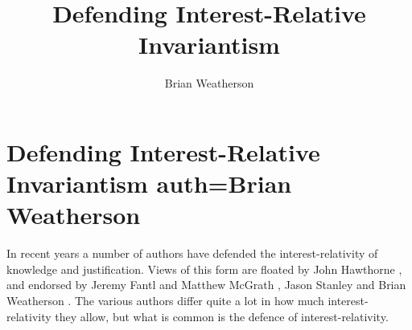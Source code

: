 \documentclass[oneside]{book}
\title{Defending Interest-Relative Invariantism}
\author{Brian Weatherson}
\begin{document}



\setcounter{paper}{0}
\pagestyle{plain}

\chapter[Defending IRI]{Defending Interest-Relative Invariantism auth=Brian Weatherson}

%
%
%

\noindent In recent years a number of authors have defended the interest-relativity of knowledge and justification.   Views of this form are floated by John Hawthorne \citeyearpar{Hawthorne2004}, and endorsed by Jeremy Fantl and Matthew McGrath \citeyearpar{Fantl2002, FantlMcGrath2009}, Jason Stanley \citeyearpar{Stanley2005-STAKAP} and Brian Weatherson \citeyearpar{Weatherson2005-WEACWD}. The various authors differ quite a lot in how much interest-relativity they allow, but what is common is the defence of interest-relativity.
\end{document}

